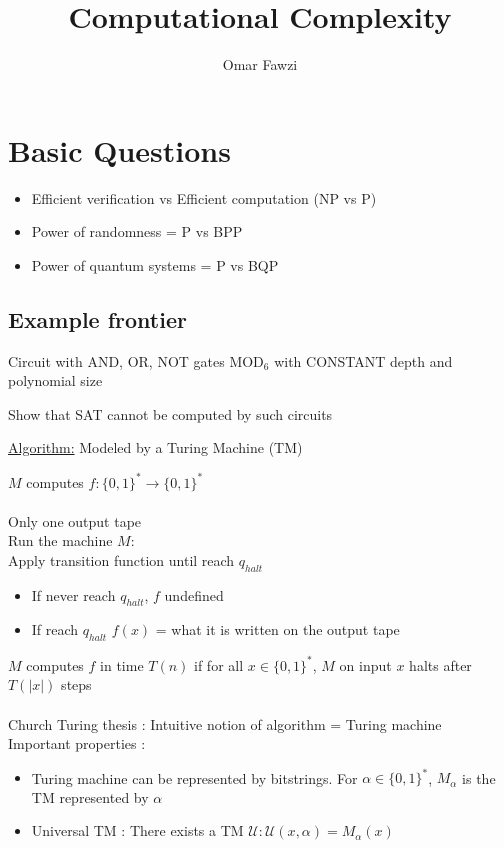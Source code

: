 \documentclass{article}
\theoremstyle{definition}
\theoremstyle{remark}
\begin{document}
	
\title{Computational Complexity}
\author{Omar Fawzi}

\maketitle
\tableofcontents

\section{Basic Questions}
\begin{itemize}
	\item Efficient verification vs Efficient computation (NP vs P)
	\item Power of randomness = P vs BPP
	\item Power of quantum systems = P vs BQP 
\end{itemize}

\subsection{Example frontier}
Circuit with AND, OR, NOT gates 
	MOD$_6$
	with CONSTANT depth and polynomial size
	
Show that SAT cannot be computed by such circuits

\underline{Algorithm:} Modeled by a Turing Machine (TM)

$M$ computes $f:\{0,1\}^* \rightarrow \{0,1\}^*$\\\\
Only one output tape\\
Run the machine $M$:\\
Apply transition function until reach $q_{halt}$

\begin{itemize}
	\item If never reach $q_{halt}$, $f$ undefined
	\item If reach $q_{halt}$ $f(x)$ = what it is written on the output tape
\end{itemize}
$M$ computes $f$ in time $T(n)$ if for all $x \in \{0,1\}^*$, $M$ on input $x$ halts after $T(|x|)$ steps\\\\
Church Turing thesis : Intuitive notion of algorithm = Turing machine\\

Important properties :
\begin{itemize}
	\item Turing machine can be represented by bitstrings. For $\alpha \in \{0,1\}^*$, $M_\alpha$ is the TM represented by $\alpha$
	\item Universal TM : There exists a TM $\mathcal{U} : \mathcal{U}(x,\alpha) = M_\alpha(x)$
\end{itemize}
\end{document}
